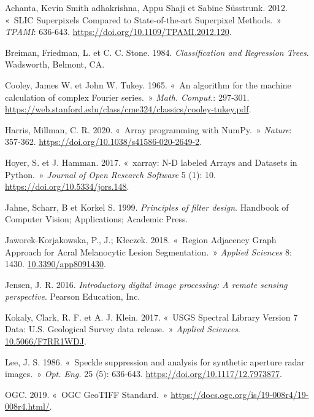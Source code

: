 \documentclass[
  french,
  11pt,
  letterpaper,
  open=any,
  twoside=false,
  french]{scrbook}
\newlength{\cslhangindent}
\newenvironment{CSLReferences}[2] %
 {\begin{list}{}{%
  \setlength{\itemindent}{0pt}
  \setlength{\leftmargin}{0pt}
  \setlength{\parsep}{0pt}
  \ifodd #1
   \setlength{\leftmargin}{\cslhangindent}
   \setlength{\itemindent}{-1\cslhangindent}
  \fi
  \setlength{\itemsep}{#2\baselineskip}}}
 {\end{list}}
\begin{document}

\protect{}\label{refs}
\begin{CSLReferences}{1}{0}
Achanta, Kevin Smith adhakrishna, Appu Shaji et Sabine Süsstrunk. 2012.
{«~SLIC Superpixels Compared to State-of-the-art Superpixel Methods.~»}
\emph{{TPAMI}}: 636‑643. \url{https://doi.org/10.1109/TPAMI.2012.120}.

Breiman, Friedman, L. et C. C. Stone. 1984. \emph{Classification and
Regression Trees}. {Wadsworth, Belmont, CA}.

Cooley, James W. et John W. Tukey. 1965. {«~An algorithm for the machine
calculation of complex Fourier series.~»} \emph{{Math. Comput.}}:
297‑301.
\url{https://web.stanford.edu/class/cme324/classics/cooley-tukey.pdf}.

Harris, Millman, C. R. 2020. {«~Array programming with NumPy.~»}
\emph{{Nature}}: 357‑362.
\url{https://doi.org/10.1038/s41586-020-2649-2}.

Hoyer, S. et J. Hamman. 2017. {«~xarray: N-D labeled Arrays and Datasets
in Python.~»} \emph{{Journal of Open Research Software}} 5 (1): 10.
\url{https://doi.org/10.5334/jors.148}.

Jahne, Scharr, B et Korkel S. 1999. \emph{Principles of filter design}.
Handbook of Computer Vision; Applications; Academic Press.

Jaworek-Korjakowska, P., J.; Kłeczek. 2018. {«~Region Adjacency Graph
Approach for Acral Melanocytic Lesion Segmentation.~»} \emph{{Applied
Sciences}} 8: 1430.
\href{https://10.3390/app8091430}{10.3390/app8091430}.

Jensen, J. R. 2016. \emph{Introductory digital image processing: A
remote sensing perspective}. {Pearson Education, Inc.}

Kokaly, Clark, R. F. et A. J. Klein. 2017. {«~USGS Spectral Library
Version 7 Data: U.S. Geological Survey data release.~»} \emph{{Applied
Sciences}}. \href{https://10.5066/F7RR1WDJ}{10.5066/F7RR1WDJ}.

Lee, J. S. 1986. {«~Speckle suppression and analysis for synthetic
aperture radar images.~»} \emph{{Opt. Eng.}} 25 (5): 636‑643.
\url{https://doi.org/10.1117/12.7973877}.

OGC. 2019. {«~{OGC GeoTIFF Standard}.~»}
\url{https://docs.ogc.org/is/19-008r4/19-008r4.html/}.

\end{CSLReferences}


\backmatter
\end{document}
